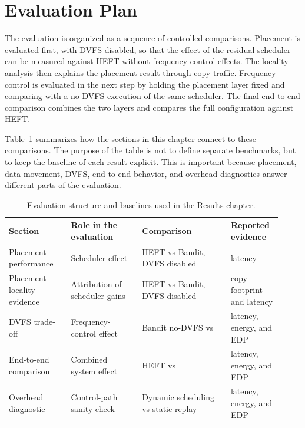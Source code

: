 \section{Evaluation Plan}
\label{sec:results-plan}

The evaluation is organized as a sequence of controlled comparisons. Placement
is evaluated first, with DVFS disabled, so that the effect of the residual
scheduler can be measured against HEFT without frequency-control effects. The
locality analysis then explains the placement result through copy traffic.
Frequency control is evaluated in the next step by holding the placement layer
fixed and comparing \WinDVFS{} with a no-DVFS execution of the same scheduler.
The final end-to-end comparison combines the two layers and compares the full
\BanditWinDVFS{} configuration against HEFT.

Table~\ref{tab:results-eval-configs} summarizes how the sections in this
chapter connect to these comparisons. The purpose of the table is not to define
separate benchmarks, but to keep the baseline of each result explicit. This is
important because placement, data movement, DVFS, end-to-end behavior, and
overhead diagnostics answer different parts of the evaluation.

\begin{table}[!htbp]
\centering
\begingroup
\footnotesize
\setlength{\tabcolsep}{4pt}
\begin{tabular}{@{}p{0.21\linewidth}p{0.24\linewidth}p{0.30\linewidth}p{0.17\linewidth}@{}}
\toprule
Section & Role in the evaluation & Comparison & Reported evidence \\
\midrule
Placement performance & Scheduler effect & HEFT vs Bandit, DVFS disabled & latency \\
Placement locality evidence & Attribution of scheduler gains & HEFT vs Bandit, DVFS disabled & copy footprint and latency \\
DVFS trade-off & Frequency-control effect & Bandit no-DVFS vs \BanditWinDVFS{} & latency, energy, and EDP \\
End-to-end comparison & Combined system effect & HEFT vs \BanditWinDVFS{} & latency, energy, and EDP \\
Overhead diagnostic & Control-path sanity check & Dynamic scheduling vs static replay & latency, energy, and EDP \\
\bottomrule
\end{tabular}%
\endgroup
\caption{Evaluation structure and baselines used in the Results chapter.}
\label{tab:results-eval-configs}
\end{table}

